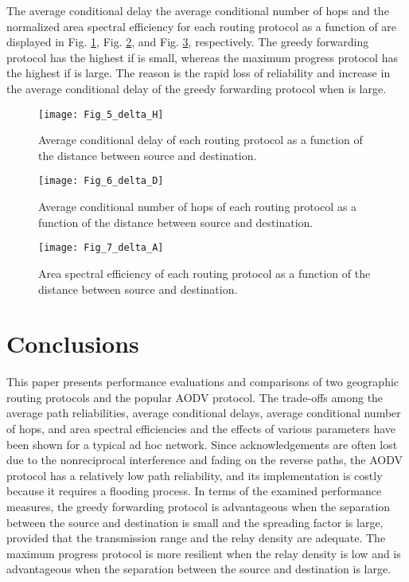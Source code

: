 \documentclass[conference]{IEEEtran}
\begin{document}
The average conditional delay  the average conditional number
of hops  and the normalized area spectral efficiency
 for each routing protocol as a function of
 are displayed in Fig. \ref{Fig.5}, Fig. \ref{Fig.6}, and Fig. \ref{Fig.7}, respectively. The greedy forwarding protocol
has the highest  if 
is small, whereas the maximum progress protocol has the highest  if  is large. The reason is the rapid loss of reliability and increase in the average conditional delay
of the greedy forwarding protocol when
 is large.



\begin{figure}[tb]\centering
\texttt{[image: Fig\_5\_delta\_H]}\caption{Average conditional delay of each routing protocol as a function of
the distance between source and destination. } \label{Fig.5}
\end{figure}

\begin{figure}[tb]\centering
\texttt{[image: Fig\_6\_delta\_D]}\caption{Average conditional number of hops of each routing protocol as a
function of the distance between source and destination.} \label{Fig.6}
\end{figure}

\begin{figure}[ptb]\centering
\texttt{[image: Fig\_7\_delta\_A]}\caption{Area spectral efficiency of each routing protocol as a function of
the distance between source and destination.} \label{Fig.7}
\end{figure}


\section{Conclusions}

This paper presents performance evaluations and comparisons of two geographic routing protocols and the
popular AODV protocol. The trade-offs among the average path reliabilities, average conditional delays, average
conditional number of hops, and area spectral efficiencies
and the effects of various parameters have been shown
for a typical ad hoc network. Since acknowledgements
are often lost due to the nonreciprocal interference and
fading on the reverse paths, the AODV protocol has a
relatively low path reliability, and its implementation
is costly because it requires a flooding process. In
terms of the examined performance measures, the greedy
forwarding protocol is advantageous when the separation
between the source and destination is small and the
spreading factor is large, provided that the transmission
range and the relay density are adequate. The maximum
progress protocol is more resilient when the relay density
is low and is advantageous when the separation between
the source and destination is large.
\end{document}
